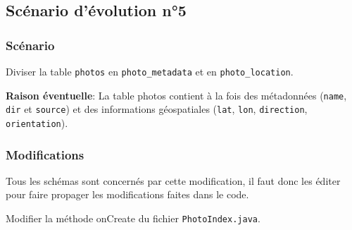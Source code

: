 \subsection{Scénario d'évolution n°5}
\subsubsection{Scénario}
Diviser la table \texttt{photos} en \texttt{photo_metadata} et en \texttt{photo_location}.

\textbf{Raison éventuelle}: La table photos contient à la fois des métadonnées (\texttt{name}, \texttt{dir} et \texttt{source}) et des informations géospatiales (\texttt{lat}, \texttt{lon}, \texttt{direction}, \texttt{orientation}).

\subsubsection{Modifications}
Tous les schémas sont concernés par cette modification, il faut donc les éditer pour faire propager les modifications faites dans le code.

Modifier la méthode onCreate du fichier \texttt{PhotoIndex.java}.

